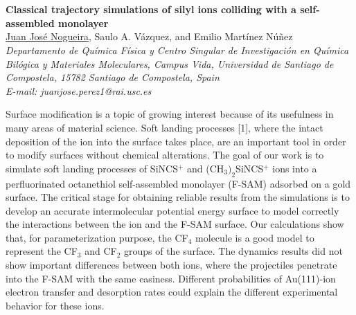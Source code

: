 \section*{}
\setcounter{figure}{0}
\begin{center}
{\bf \Large
 Classical trajectory simulations of silyl ions colliding with a self-assembled monolayer
}
\\
\vspace{0.5cm}
\underline{Juan José Nogueira}, Saulo A. Vázquez, and Emilio Martínez Núñez
\\
\vspace{0.5cm}
{\it Departamento de Química Física y Centro Singular de Investigación en Química Bilógica y
 Materiales Moleculares, Campus Vida, Universidad de Santiago de Compostela, 15782 Santiago de
                                           Compostela, Spain
}
\\
\vspace{0.5cm}
{\it E-mail: juanjose.perez1@rai.usc.es}
\\
\vspace{0.5cm}
\end{center}
        Surface modification is a topic of growing interest because of its usefulness in
many areas of material science. Soft landing processes [1], where the intact
deposition of the ion into the surface takes place, are an important tool in order to
modify surfaces without chemical alterations.
        The goal of our work is to simulate soft landing processes of SiNCS$^+$ and
(CH$_3$$)_2$SiNCS$^+$ ions into a perfluorinated octanethiol self-assembled monolayer (F-SAM)
 adsorbed on a gold surface. The critical stage for obtaining reliable results
from the simulations is to develop an accurate intermolecular potential energy
surface to model correctly the interactions between the ion and the F-SAM surface.
Our calculations show that, for parameterization purpose, the CF$_4$ molecule is a good
model to represent the CF$_3$ and CF$_2$ groups of the surface. The dynamics results did
not show important differences between both ions, where the projectiles penetrate
into the F-SAM with the same easiness. Different probabilities of Au(111)-ion
electron transfer and desorption rates could explain the different experimental
behavior for these ions.
\\
\vspace{0.5cm}

